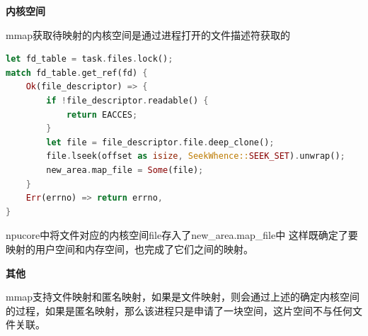 \textbf{内核空间}

mmap获取待映射的内核空间是通过进程打开的文件描述符获取的
\begin{lstlisting}[language={Rust},
	caption={os/src/mm/memory_set.rs}]
let fd_table = task.files.lock();
match fd_table.get_ref(fd) {
    Ok(file_descriptor) => {
        if !file_descriptor.readable() {
            return EACCES;
        }
        let file = file_descriptor.file.deep_clone();
        file.lseek(offset as isize, SeekWhence::SEEK_SET).unwrap();
        new_area.map_file = Some(file);
    }
    Err(errno) => return errno,
}
\end{lstlisting}
npucore中将文件对应的内核空间file存入了new\_area.map\_file中
这样既确定了要映射的用户空间和内存空间，也完成了它们之间的映射。

\textbf{其他}

mmap支持文件映射和匿名映射，如果是文件映射，则会通过上述的确定内核空间的过程，如果是匿名映射，那么该进程只是申请了一块空间，这片空间不与任何文件关联。

